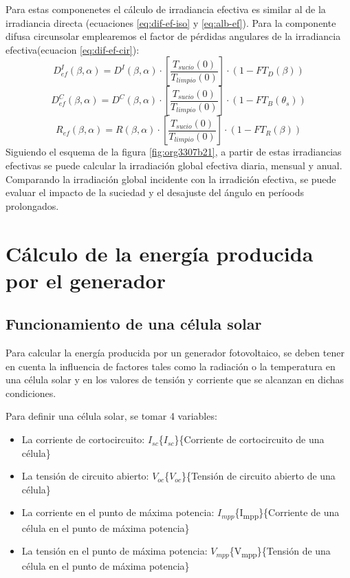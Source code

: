 Para estas componenetes el cálculo de irradiancia efectiva es similar al de la irradiancia directa (ecuaciones \ref{eq:dif-ef-iso} y \ref{eq:alb-ef}). Para la componente difusa circunsolar emplearemos el factor de pérdidas angulares de la irradiancia efectiva(ecuacion \ref{eq:dif-ef-cir}):
\begin{equation}
D_{ef}^I(\beta ,\alpha)=D^I(\beta ,\alpha)\cdot[\frac{T_{sucio}(0)}{T_{limpio}(0)}]\cdot (1-FT_D(\beta))
\label{eq:dif-ef-iso}
\end{equation}
\begin{equation}
D_{ef}^C(\beta ,\alpha)=D^C(\beta ,\alpha)\cdot[\frac{T_{sucio}(0)}{T_{limpio}(0)}]\cdot (1-FT_B(\theta_s))
\label{eq:dif-ef-cir}
\end{equation}
\begin{equation}
R_{ef}(\beta ,\alpha)=R(\beta ,\alpha)\cdot[\frac{T_{sucio}(0)}{T_{limpio}(0)}]\cdot (1-FT_R(\beta))
\label{eq:alb-ef}
\end{equation}
Siguiendo el esquema de la figura \ref{fig:org3307b21}, a partir de estas irradiancias efectivas se puede calcular la irradiación global efectiva diaria, mensual y anual. Comparando la irradiación global incidente con la irradición efectiva, se puede evaluar el impacto de la suciedad y el desajuste del ángulo en períoods prolongados.

\section{Cálculo de la energía producida por el generador}
\label{sec:orgd3d9270}
\label{sec:calculo-energia-producida-generador}

\subsection{Funcionamiento de una célula solar}
\label{sec:orgd81000f}
\label{subsec:funcionamiento-celula-solar}
Para calcular la energía producida por un generador fotovoltaico, se deben tener en cuenta la influencia de factores tales como la radiación o la temperatura en una célula solar y en los valores de tensión y corriente que se alcanzan en dichas condiciones.

Para definir una célula solar, se tomar 4 variables:
\begin{itemize}
\item La corriente de cortocircuito: \(I_{sc}\)\nomenclature[Isc]\{\(I_{sc}\)\}\{Corriente de cortocircuito de una célula\}
\item La tensión de circuito abierto: \(V_{oc}\)\nomenclature[VOC]\{\(V_{oc}\)\}\{Tensión de circuito abierto de una célula\}
\item La corriente en el punto de máxima potencia: \(I_{mpp}\)\nomenclature[Impp]\{I\textsubscript{mpp}\}\{Corriente de una célula en el punto de máxima potencia\}
\item La tensión en el punto de máxima potencia: \(V_{mpp}\)\nomenclature[Vmpp]\{V\textsubscript{mpp}\}\{Tensión de una célula en el punto de máxima potencia\}
\end{itemize}

